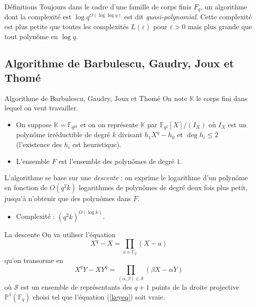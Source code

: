 \documentclass[xcolor=x11names,compress]{beamer}
\theoremstyle{break}
\theoremstyle{sc}
\theoremstyle{definition}
\theoremstyle{remark}
\begin{document}
\begin{frame}{Définitions}
 Toujours dans le cadre d'une famille de corps finis $F_q$, un algorithme dont
 la complexité est  $\log q^{O(\log\log q)}$ est dit \emph{quasi-polynomial}. Cette
 complexité est plus petite que toutes les complexités $L(\varepsilon)$ pour
 $\varepsilon>0$ mais plus grande que tout polynôme en $\log q$.
\end{frame}

\subsection{Algorithme de Barbulescu, Gaudry, Joux et Thomé}

\begin{frame}{Algorithme de Barbulescu, Gaudry, Joux et Thomé}
  On note $\mathbb{K}$ le corps fini dans lequel on veut travailler.
  \begin{itemize}
    \item On suppose $\mathbb{K}=\mathbb{F}_{q^{2k}}$ et on on représente
  $\mathbb{K}$ par $\mathbb{F}_{q^2}[X]/(I_X)$ où $I_X$ est un polynôme
  irréductible de degré $k$ divisant $h_1X^q-h_0$ et $\deg h_i\leq 2$
  (l'existence des $h_i$ est heuristique).
    \item L'ensemble $F$ est l'ensemble des polynômes de degré $1$.
\end{itemize}

    L'algorithme se base sur une \emph{descente} : on exprime le logarithme d'un
    polynôme en fonction de $O(q^2k)$ logarithmes de polynômes de degré deux
    fois plus petit, jusqu'à n'obtenir que des polynômes dans $F$.
    \begin{itemize}
      \item Complexité : $(q^2k)^{O(\log k)}$.
    \end{itemize}

\end{frame}

\begin{frame}{La descente}
 On va utiliser l'équation 
 \[
   X^q - X = \prod_{a\in\mathbb{F}_q}(X-a)
 \]
 qu'on transorme en
 \begin{equation}
   X^qY - XY^q = \prod_{(\alpha, \beta)\in\mathcal S}(\beta X - \alpha Y)
   \label{keyeq}
 \end{equation}
 où $\mathcal S$ est un ensemble de représentants des $q+1$ points de la droite
 projective $\mathbb{P}^1(\mathbb{F}_q)$ choisi tel que l'équation
 (\ref{keyeq}) soit vraie.
\end{frame}
\end{document}
